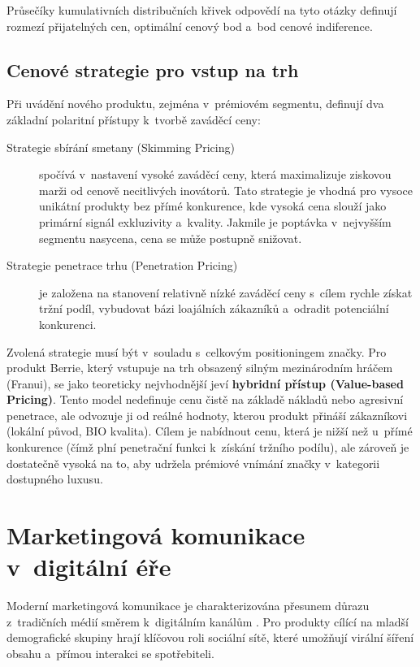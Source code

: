 Průsečíky kumulativních distribučních křivek odpovědí na tyto otázky definují rozmezí přijatelných cen, optimální cenový bod a~bod cenové indiference.

\subsection{Cenové strategie pro vstup na trh}
\label{subsec:theory_pricing_strategies}

Při uvádění nového produktu, zejména v~prémiovém segmentu, definují \textcite{nagle_2018} dva základní polaritní přístupy k~tvorbě zaváděcí ceny:

\begin{description}
  \item[Strategie sbírání smetany (Skimming Pricing)] spočívá v~nastavení vysoké zaváděcí ceny, která maximalizuje ziskovou marži od cenově necitlivých inovátorů. Tato strategie je vhodná pro vysoce unikátní produkty bez přímé konkurence, kde vysoká cena slouží jako primární signál exkluzivity a~kvality. Jakmile je poptávka v~nejvyšším segmentu nasycena, cena se může postupně snižovat.
  \item[Strategie penetrace trhu (Penetration Pricing)] je založena na stanovení relativně nízké zaváděcí ceny s~cílem rychle získat tržní podíl, vybudovat bázi loajálních zákazníků a~odradit potenciální konkurenci. 
\end{description}

Zvolená strategie musí být v~souladu s~celkovým positioningem značky. Pro produkt Berrie, který vstupuje na trh obsazený silným mezinárodním hráčem (Franui), se jako teoreticky nejvhodnější jeví \textbf{hybridní přístup (Value-based Pricing)}. Tento model nedefinuje cenu čistě na základě nákladů nebo agresivní penetrace, ale odvozuje ji od reálné hodnoty, kterou produkt přináší zákazníkovi (lokální původ, BIO kvalita). Cílem je nabídnout cenu, která je nižší než u~přímé konkurence (čímž plní penetrační funkci k~získání tržního podílu), ale zároveň je dostatečně vysoká na to, aby udržela prémiové vnímání značky v~kategorii dostupného luxusu.

\section{Marketingová komunikace v~digitální éře}
\label{sec:theory_marcom}

Moderní marketingová komunikace je charakterizována přesunem důrazu z~tradičních médií směrem k~digitálním kanálům \parencite{pelsmacker_2018}. Pro produkty cílící na mladší demografické skupiny hrají klíčovou roli sociální sítě, které umožňují virální šíření obsahu a~přímou interakci se spotřebiteli.

